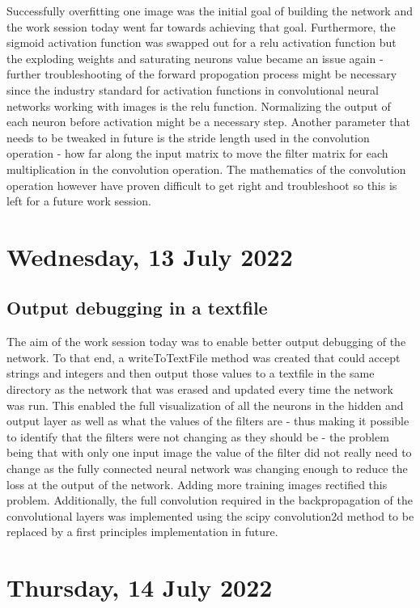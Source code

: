 Successfully overfitting one image was the initial goal of building the network and the work session today went far towards achieving that goal. Furthermore, the sigmoid activation function was swapped out for a relu activation function but the exploding weights and saturating neurons value became an issue again - further troubleshooting of the forward propogation process might be necessary since the industry standard for activation functions in convolutional neural networks working with images is the relu function. Normalizing the output of each neuron before activation might be a necessary step. Another parameter that needs to be tweaked in future is the stride length used in the convolution operation - how far along the input matrix to move the filter matrix for each multiplication in the convolution operation. The mathematics of the convolution operation however have proven difficult to get right and troubleshoot so this is left for a future work session.

\section[2022/07/13]{Wednesday, 13 July 2022}

\subsection{Output debugging in a textfile}

The aim of the work session today was to enable better output debugging of the network. To that end, a writeToTextFile method was created that could accept strings and integers and then output those values to a textfile in the same directory as the network that was erased and updated every time the network was run. This enabled the full visualization of all the neurons in the hidden and output layer as well as what the values of the filters are - thus making it possible to identify that the filters were not changing as they should be - the problem being that with only one input image the value of the filter did not really need to change as the fully connected neural network was changing enough to reduce the loss at the output of the network. Adding more training images rectified this problem. Additionally, the full convolution required in the backpropagation of the convolutional layers was implemented using the scipy convolution2d method to be replaced by a first principles implementation in future. 

\section[2022/07/14]{Thursday, 14 July 2022}

